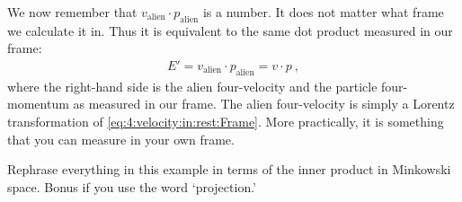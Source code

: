 \documentclass[12pt, oneside]{report}    %
\let\oldsection\section
\def\section{%
  \setcounter{sidenote}{1}%
  \oldsection
}
\begin{document}
We now remember that $v_\text{alien}\cdot p_\text{alien}$ is a number. It does not matter what frame we calculate it in. Thus it is equivalent to the same dot product measured in our frame:
\begin{align}
E'=
    v_\text{alien}\cdot p_\text{alien} = v\cdot p \ ,
\end{align}
where the right-hand side is the alien four-velocity and the particle four-momentum as measured in our frame. The alien four-velocity is simply a Lorentz transformation of \eqref{eq:4:velocity:in:rest:Frame}. More practically, it is something that you can measure in your own frame. 


\begin{exercise}
Rephrase everything in this example in terms of the inner product in Minkowski space. Bonus if you use the word `projection.'
\end{exercise}









\end{document}
